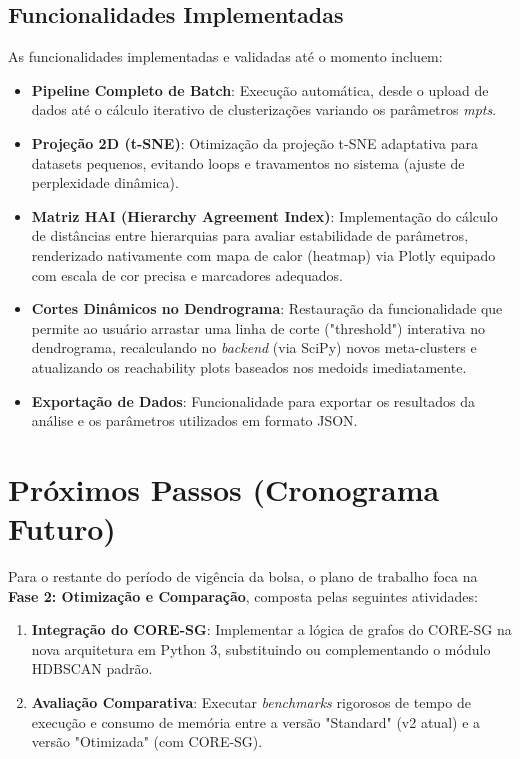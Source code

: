 \documentclass[12pt,a4paper]{article}
\begin{document}
\subsection{Funcionalidades Implementadas}

As funcionalidades implementadas e validadas até o momento incluem:

\begin{itemize}
    \item \textbf{Pipeline Completo de Batch}: Execução automática, desde o upload de dados até o cálculo iterativo de clusterizações variando os parâmetros \textit{mpts}.
    \item \textbf{Projeção 2D (t-SNE)}: Otimização da projeção t-SNE adaptativa para datasets pequenos, evitando loops e travamentos no sistema (ajuste de perplexidade dinâmica).
    \item \textbf{Matriz HAI (Hierarchy Agreement Index)}: Implementação do cálculo de distâncias entre hierarquias para avaliar estabilidade de parâmetros, renderizado nativamente com mapa de calor (heatmap) via Plotly equipado com escala de cor precisa e marcadores adequados.
    \item \textbf{Cortes Dinâmicos no Dendrograma}: Restauração da funcionalidade que permite ao usuário arrastar uma linha de corte ("threshold") interativa no dendrograma, recalculando no \textit{backend} (via SciPy) novos meta-clusters e atualizando os reachability plots baseados nos medoids imediatamente.
    \item \textbf{Exportação de Dados}: Funcionalidade para exportar os resultados da análise e os parâmetros utilizados em formato JSON.
\end{itemize}

\section{Próximos Passos (Cronograma Futuro)}

Para o restante do período de vigência da bolsa, o plano de trabalho foca na \textbf{Fase 2: Otimização e Comparação}, composta pelas seguintes atividades:

\begin{enumerate}
    \item \textbf{Integração do CORE-SG}: Implementar a lógica de grafos do CORE-SG na nova arquitetura em Python 3, substituindo ou complementando o módulo HDBSCAN padrão.
    \item \textbf{Avaliação Comparativa}: Executar \textit{benchmarks} rigorosos de tempo de execução e consumo de memória entre a versão "Standard" (v2 atual) e a versão "Otimizada" (com CORE-SG).
\end{enumerate}
\end{document}
